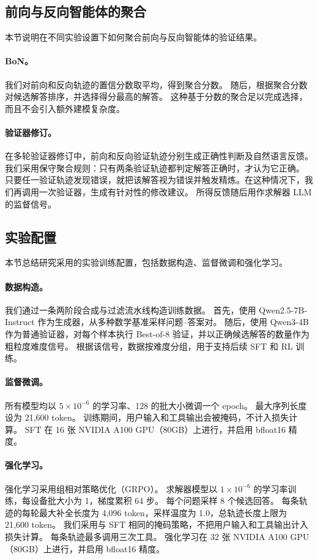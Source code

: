 \documentclass[11pt]{article}
\begin{document}
\subsection{前向与反向智能体的聚合}
\label{sec:appendix_aggregation}
本节说明在不同实验设置下如何聚合前向与反向智能体的验证结果。

\paragraph{BoN。}
我们对前向和反向轨迹的置信分数取平均，得到聚合分数。
随后，根据聚合分数对候选解答排序，并选择得分最高的解答。
这种基于分数的聚合足以完成选择，而且不会引入额外建模复杂度。

\paragraph{验证器修订。}
在多轮验证器修订中，前向和反向验证轨迹分别生成正确性判断及自然语言反馈。
我们采用保守聚合规则：只有两条验证轨迹都判定解答正确时，才认为它正确。
只要任一验证轨迹发现错误，就把该解答视为错误并触发精炼。在这种情况下，我们再调用一次验证器，生成有针对性的修改建议。
所得反馈随后用作求解器 LLM 的监督信号。

\subsection{实验配置}
\label{sec:appendix_impl_details}

本节总结研究采用的实验训练配置，包括数据构造、监督微调和强化学习。

\paragraph{数据构造。}
我们通过一条两阶段合成与过滤流水线构造训练数据。
首先，使用 Qwen2.5-7B-Instruct 作为生成器，从多种数学基准采样问题--答案对。
随后，使用 Qwen3-4B 作为普通验证器，对每个样本执行 Best-of-8 验证，并以正确候选解答的数量作为粗粒度难度信号。
根据该信号，数据按难度分组，用于支持后续 SFT 和 RL 训练。

\paragraph{监督微调。}
所有模型均以 $5\times10^{-6}$ 的学习率、128 的批大小微调一个 epoch。
最大序列长度设为 21{,}600 token。
训练期间，用户输入和工具输出会被掩码，不计入损失计算。
SFT 在 16 张 NVIDIA A100 GPU（80GB）上进行，并启用 bfloat16 精度。

\paragraph{强化学习。}
强化学习采用组相对策略优化（GRPO）。
求解器模型以 $1\times10^{-6}$ 的学习率训练，每设备批大小为 1，梯度累积 64 步。
每个问题采样 8 个候选回答。
每条轨迹的每轮最大补全长度为 4{,}096 token，采样温度为 1.0，总轨迹长度上限为 21{,}600 token。
我们采用与 SFT 相同的掩码策略，不把用户输入和工具输出计入损失计算。
每条轨迹最多调用三次工具。
强化学习在 32 张 NVIDIA A100 GPU（80GB）上进行，并启用 bfloat16 精度。
\end{document}
